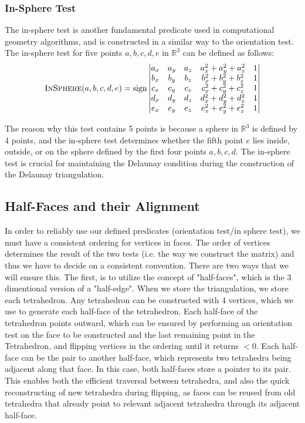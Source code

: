 \documentclass{article}
\begin{document}
\subsubsection{In-Sphere Test}
The in-sphere test is another fundamental predicate used in computational geometry algorithms, and is constructed in a similar way to the orientation test. The in-sphere test for five points $a, b, c, d, e$ in $\mathbb{R}^3$ can be defined as follows:
\begin{equation}
    \textsc{InSphere}(a, b, c, d, e) = \text{sign} \begin{vmatrix}
    a_x & a_y & a_z & a_x^2 + a_y^2 + a_z^2 & 1 \\
    b_x & b_y & b_z & b_x^2 + b_y^2 + b_z^2 & 1 \\
    c_x & c_y & c_z & c_x^2 + c_y^2 + c_z^2 & 1 \\
    d_x & d_y & d_z & d_x^2 + d_y^2 + d_z^2 & 1 \\
    e_x & e_y & e_z & e_x^2 + e_y^2 + e_z^2 & 1
    \end{vmatrix}
\end{equation}

The reason why this test contains 5 points is because a sphere in $\mathbb{R}^3$ is defined by 4 points, and the in-sphere test determines whether the fifth point $e$ lies inside, outside, or on the sphere defined by the first four points $a, b, c, d$. The in-sphere test is crucial for maintaining the Delaunay condition during the construction of the Delaunay triangulation.

\subsection{Half-Faces and their Alignment}
In order to reliably use our defined predicates (orientation test/in sphere test), we must have a consistent ordering for vertices in faces. The order of vertices determines the result of the two tests (i.e. the way we construct the matrix) and thus we have to decide on a consistent convention. There are two ways that we will ensure this. The first, is to utilize the concept of "half-faces", which is the 3 dimentional version of a "half-edge". When we store the triangulation, we store each tetrahedron. Any tetrahedron can be constructed with 4 vertices, which we use to generate each half-face of the tetrahedron. Each half-face of the tetrahedron points outward, which can be ensured by performing an orientation test on the face to be constructed and the last remaining point in the Tetrahedron, and flipping vertices in the ordering until it returns $<0$. Each half-face can be the pair to another half-face, which represents two tetrahedra being adjacent along that face. In this case, both half-faces store a pointer to its pair. This enables both the efficient traversal between tetrahedra, and also the quick reconstructing of new tetrahedra during flipping, as faces can be reused from old tetrahedra that already point to relevant adjacent tetrahedra through its adjacent half-face.  
\end{document}
